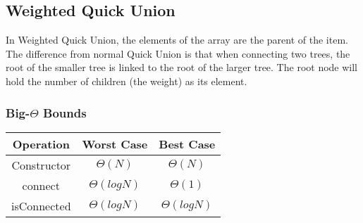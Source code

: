\documentclass{article}
\begin{document}
\subsection{Weighted Quick Union}
In Weighted Quick Union, the elements of the array are the parent of the item.
The difference from normal Quick Union is that when connecting two trees, the root of the smaller tree is linked to the root of the larger tree.
The root node will hold the number of children (the weight) as its element.
\subsubsection{Big-$\Theta$ Bounds}
\begin{center}
    \begin{tabular}{ c | c | c }
     Operation & Worst Case & Best Case\\
     \hline
     Constructor & $\Theta(N)$ & $\Theta(N)$\\ 
     connect & $\Theta(logN)$ & $\Theta(1)$\\  
     isConnected & $\Theta(logN)$ & $\Theta(logN)$\\
    \end{tabular}
\end{center}
\end{document}
